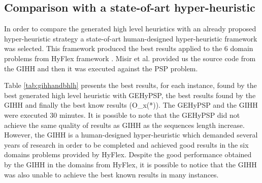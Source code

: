 \documentclass[conference]{IEEEtran}
\begin{document}
\begin{table}[]
	\centering
	\caption{Results from the best individual found in GEHyPSP-3}
	\label{bestGExp3}
\end{table}




\subsection{Comparison with a state-of-art hyper-heuristic}
In order to compare the generated high level heuristics with an already proposed hyper-heuristic strategy a state-of-art human-designed hyper-heuristic framework \cite{misir2012intelligent} was selected. This framework produced the best results applied to the 6 domain problems from HyFlex framework \cite{ochoa2012hyflex}. Misir et al. \cite{misir2012intelligent} provided us the source code from the GIHH and then it was executed against the PSP problem. 

Table \ref{tab:gihhandbhlh} presents the best results, for each instance, found by the best generated high level heuristic with GEHyPSP, the best results found by the GIHH \cite{misir2012intelligent} and finally the best know results (O_x(*)). The GEHyPSP and the GIHH were executed 30 minutes. It is possible to note that the GEHyPSP did not achieve the same quality of results as GIHH as the sequences length increase. However, the GIHH is a human-designed hyper-heuristic which demanded several years of research in order to be completed and achieved good results in the six domains problems provided by HyFlex. Despite the good performance obtained by the GIHH in the domains from HyFlex, it is possible to notice that the GIHH was also unable to achieve the best known results in many instances.
\end{document}
